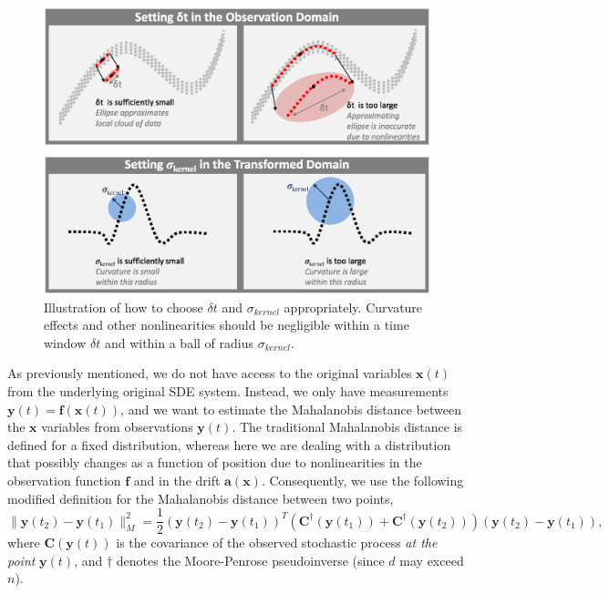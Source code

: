 \begin{figure}[t]
\centering
\includegraphics[width=\textwidth]{schematic}
\caption[Schematic of analysis parameters for multiscale data]{Illustration of how to choose $\delta t$ and $\sigma_{kernel}$ appropriately. 	Curvature effects and other nonlinearities should be negligible within a time window $\delta t$ and within a ball of radius $\sigma_{kernel}$.}
\label{fig:schematic}
\end{figure}


As previously mentioned, we do not have access to the original variables $\mathbf{x}(t)$ from the underlying original SDE system.
%
Instead, we only have measurements $\mathbf{y}(t) = \mathbf{f} (\mathbf{x}(t))$, and we want to estimate the Mahalanobis distance between the $\mathbf{x}$ variables from observations $\mathbf{y}(t)$.
%
The traditional Mahalanobis distance is defined for a fixed distribution,
whereas here we are dealing with a distribution that possibly changes as a function of position due to
nonlinearities in the observation function $\mathbf{f}$ and in the drift $\mathbf{a}(\mathbf{x})$.
%
Consequently, we use the following modified definition for the Mahalanobis distance between two points,
\begin{equation} \label{eq:mahalanobis_distance}
 \| \mathbf{y}(t_2) - \mathbf{y}(t_1) \|^2_M =
 \frac{1}{2} (\mathbf{y}(t_2) - \mathbf{y}(t_1))^T \left( \mathbf{C}^{\dagger}(\mathbf{y}(t_1)) + \mathbf{C}^{\dagger}(\mathbf{y}(t_2)) \right) (\mathbf{y}(t_2) - \mathbf{y}(t_1)),
 \end{equation}
where $\mathbf{C}(\mathbf{y}(t))$ is the covariance of the observed stochastic process {\em at the point} $\mathbf{y}(t)$,
%
and $\dagger$ denotes the Moore-Penrose pseudoinverse (since $d$ may exceed $n$).

